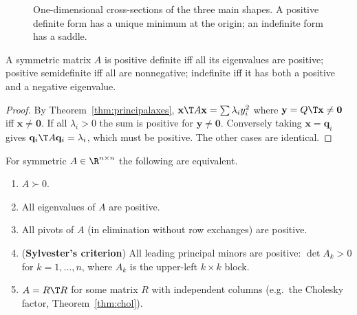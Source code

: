 \begin{figure}[h]
\centering
{}
\caption{One-dimensional cross-sections of the three main shapes. A positive definite form has a unique minimum at the origin; an indefinite form has a saddle.}
\end{figure}

\begin{theorem}\label{thm:eigdef}
A symmetric matrix $A$ is positive definite iff all its eigenvalues are positive; positive semidefinite iff all are nonnegative; indefinite iff it has both a positive and a negative eigenvalue.
\end{theorem}

\begin{proof}
By Theorem~\ref{thm:principalaxes}, $\mathbf{x}\T A\mathbf{x}=\sum\lambda_iy_i^2$ where $\mathbf{y}=Q\T\mathbf{x}\ne\mathbf{0}$ iff $\mathbf{x}\ne\mathbf{0}$. If all $\lambda_i>0$ the sum is positive for $\mathbf{y}\ne\mathbf{0}$. Conversely taking $\mathbf{x}=\mathbf{q}_i$ gives $\mathbf{q}_i\T A\mathbf{q}_i=\lambda_i$, which must be positive. The other cases are identical.
\end{proof}

\begin{theorem}\label{thm:pdequiv}
For symmetric $A\in\R^{n\times n}$ the following are equivalent.
\begin{enumerate}[label=(\alph*)]
  \item $A\succ0$.
  \item All eigenvalues of $A$ are positive.
  \item All pivots of $A$ (in elimination without row exchanges) are positive.
  \item (\textbf{Sylvester's criterion}) All leading principal minors are positive: $\det A_k>0$ for $k=1,\dots,n$, where $A_k$ is the upper-left $k\times k$ block.
  \item $A=R\T R$ for some matrix $R$ with independent columns (e.g.\ the Cholesky factor, Theorem~\ref{thm:chol}).
\end{enumerate}
\end{theorem}

